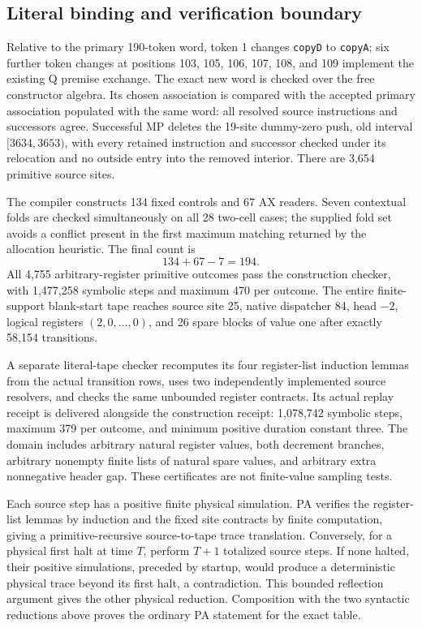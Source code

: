 \subsection{Literal binding and verification boundary}

Relative to the primary 190-token word, token 1 changes
\texttt{copyD} to \texttt{copyA}; six further token changes at positions
103, 105, 106, 107, 108, and 109 implement the existing Q premise exchange.
The exact new word is checked over the free constructor algebra. Its
chosen association is compared with the accepted primary association
populated with the same word: all resolved source instructions and
successors agree. Successful MP deletes the 19-site dummy-zero push,
old interval $[3634,3653)$, with every retained instruction and successor
checked under its relocation and no outside entry into the removed
interior. There are 3,654 primitive source sites.

The compiler constructs 134 fixed controls and 67 AX readers. Seven
contextual folds are checked simultaneously on all 28 two-cell cases;
the supplied fold set avoids a conflict present in the first maximum
matching returned by the allocation heuristic. The final count is
\[
                       134+67-7=194.
\]
All 4,755 arbitrary-register primitive outcomes pass the construction
checker, with 1,477,258 symbolic steps and maximum 470 per outcome.
The entire finite-support blank-start tape reaches source site 25,
native dispatcher 84, head $-2$, logical registers $(2,0,\ldots,0)$,
and 26 spare blocks of value one after exactly 58,154 transitions.

A separate literal-tape checker recomputes its four register-list
induction lemmas from the actual transition rows, uses two independently
implemented source resolvers, and checks the same unbounded register
contracts. Its actual replay receipt is delivered alongside the
construction receipt: 1,078,742 symbolic steps, maximum 379 per outcome,
and minimum positive duration constant three. The domain includes arbitrary natural register
values, both decrement branches, arbitrary nonempty finite lists of
natural spare values, and arbitrary extra nonnegative header gap.
These certificates are not finite-value sampling tests.

Each source step has a positive finite physical simulation. PA verifies
the register-list lemmas by induction and the fixed site contracts by
finite computation, giving a primitive-recursive source-to-tape trace
translation. Conversely, for a physical first halt at time $T$, perform
$T+1$ totalized source steps. If none halted, their positive simulations,
preceded by startup, would produce a deterministic physical trace beyond
its first halt, a contradiction. This bounded reflection argument gives
the other physical reduction. Composition with the two syntactic
reductions above proves the ordinary PA statement for the exact table.
